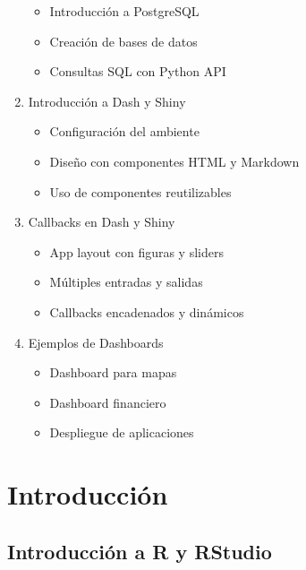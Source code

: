\documentclass[
]{book}
\providecommand{\tightlist}{%
  \setlength{\itemsep}{0pt}\setlength{\parskip}{0pt}}
\begin{document}
\begin{enumerate}
  \begin{itemize}
  \tightlist
  \item
    Introducción a PostgreSQL\\
  \item
    Creación de bases de datos\\
  \item
    Consultas SQL con Python API
  \end{itemize}
\item
  Introducción a Dash y Shiny

  \begin{itemize}
  \tightlist
  \item
    Configuración del ambiente\\
  \item
    Diseño con componentes HTML y Markdown\\
  \item
    Uso de componentes reutilizables
  \end{itemize}
\item
  Callbacks en Dash y Shiny

  \begin{itemize}
  \tightlist
  \item
    App layout con figuras y sliders\\
  \item
    Múltiples entradas y salidas\\
  \item
    Callbacks encadenados y dinámicos
  \end{itemize}
\item
  Ejemplos de Dashboards

  \begin{itemize}
  \tightlist
  \item
    Dashboard para mapas\\
  \item
    Dashboard financiero\\
  \item
    Despliegue de aplicaciones
  \end{itemize}
\end{enumerate}

\chapter{Introducción}\label{intro}

\section{Introducción a R y RStudio}\label{introducciuxf3n-a-r-y-rstudio}
\end{document}
